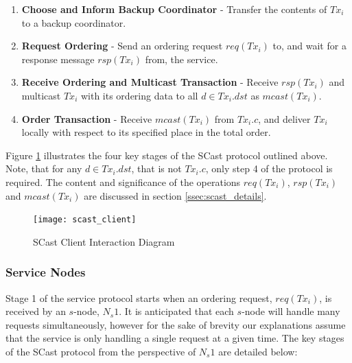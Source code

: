     \begin{enumerate}[label=\bfseries C\arabic*]
        \item    \textbf{Choose and Inform Backup Coordinator} - Transfer the contents of $Tx_i$ to a backup coordinator.    
        
        \item    \textbf{Request Ordering} - Send an ordering request $req(Tx_i)$ to, and wait for a response message $rsp(Tx_i)$ from, the service.  
        
        \item    \textbf{Receive Ordering and Multicast Transaction} - Receive $rsp(Tx_i)$ and multicast $Tx_i$ with its ordering data to all $d \in Tx_i.dst$ as $mcast(Tx_i)$.  
        
        \item    \textbf{Order Transaction} - Receive $mcast(Tx_i)$ from $Tx_i.c$, and deliver $Tx_i$ locally with respect to its specified place in the total order.   
    \end{enumerate}
    
    Figure \ref{fig:scast_client} illustrates the four key stages of the \textsf{SCast} protocol outlined above.  Note, that for any $d \in Tx_i.dst$, that is not $Tx_i.c$, only step 4 of the protocol is required.  The content and significance of the operations $req(Tx_i)$, $rsp(Tx_i)$ and $mcast(Tx_i)$ are discussed in section \ref{ssec:scast_details}.  

    \begin{figure}[htbp!] 
        \centering    
         \texttt{[image: scast\_client]}
         \caption[SCast Client Interactions]{SCast Client Interaction Diagram}
         \label{fig:scast_client}
    \end{figure}	
    
    
    \subsubsection*{Service Nodes}
    Stage 1 of the service protocol starts when an ordering request, $req(Tx_i)$, is received by an $s$-node, $N_s1$.  It is anticipated that each $s$-node will handle many requests simultaneously, however for the sake of brevity our explanations assume that the service is only handling a single request at a given time.  The key stages of the \textsf{SCast} protocol from the perspective of $N_s1$ are detailed below:
    
